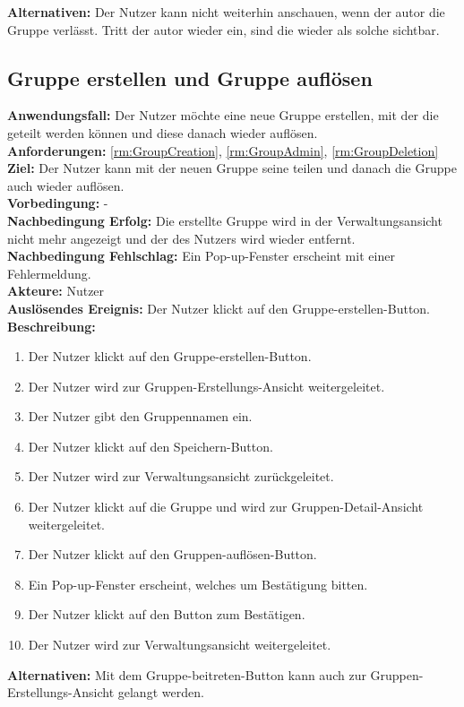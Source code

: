 \documentclass[parskip=full]{scrartcl}
\begin{document}
\textbf{Alternativen:} Der Nutzer kann   nicht weiterhin anschauen, wenn der \gls{autor} die Gruppe verlässt. Tritt der \gls{autor} wieder ein, sind die   wieder als solche sichtbar.
\newpage

\subsection{Gruppe erstellen und Gruppe auflösen}
\textbf{Anwendungsfall:} Der Nutzer möchte eine neue Gruppe erstellen, mit der die  geteilt werden können und diese danach wieder auflösen.\\
\textbf{Anforderungen:} \ref{rm:GroupCreation}, \ref{rm:GroupAdmin}, \ref{rm:GroupDeletion} \\
\textbf{Ziel:} Der Nutzer kann mit der neuen Gruppe seine  teilen und danach die Gruppe auch wieder auflösen.\\
\textbf{Vorbedingung:} -\\
\textbf{Nachbedingung Erfolg:} Die erstellte Gruppe wird in der Verwaltungsansicht nicht mehr angezeigt und der  des Nutzers wird wieder entfernt.\\
\textbf{Nachbedingung Fehlschlag:} Ein Pop-up-Fenster erscheint mit einer Fehlermeldung.\\
\textbf{Akteure:} Nutzer\\
\textbf{Auslösendes Ereignis:} Der Nutzer klickt auf den Gruppe-erstellen-Button.\\
\textbf{Beschreibung:}
\begin{enumerate}
    \item Der Nutzer klickt auf den Gruppe-erstellen-Button.
    \item Der Nutzer wird zur Gruppen-Erstellungs-Ansicht weitergeleitet.
    \item Der Nutzer gibt den Gruppennamen ein.
    \item Der Nutzer klickt auf den Speichern-Button.
    \item Der Nutzer wird zur Verwaltungsansicht zurückgeleitet.
    \item Der Nutzer klickt auf die Gruppe und wird zur Gruppen-Detail-Ansicht weitergeleitet.
    \item Der Nutzer klickt auf den Gruppen-auflösen-Button.
    \item Ein Pop-up-Fenster erscheint, welches um Bestätigung bitten.
    \item Der Nutzer klickt auf den Button zum Bestätigen.
    \item Der Nutzer wird zur Verwaltungsansicht weitergeleitet.
\end{enumerate}
\textbf{Alternativen:} Mit dem Gruppe-beitreten-Button kann auch zur Gruppen-Erstellungs-Ansicht gelangt werden.
\newpage
\end{document}
